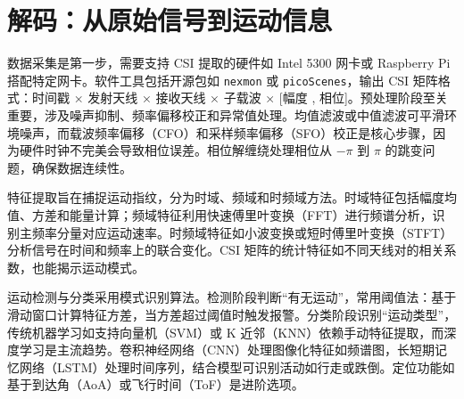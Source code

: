 \chapter{解码：从原始信号到运动信息}
数据采集是第一步，需要支持 CSI 提取的硬件如 Intel 5300 网卡或 Raspberry Pi 搭配特定网卡。软件工具包括开源包如 \texttt{nexmon} 或 \texttt{picoScenes}，输出 CSI 矩阵格式：时间戳 × 发射天线 × 接收天线 × 子载波 × [幅度 , 相位]。预处理阶段至关重要，涉及噪声抑制、频率偏移校正和异常值处理。均值滤波或中值滤波可平滑环境噪声，而载波频率偏移（CFO）和采样频率偏移（SFO）校正是核心步骤，因为硬件时钟不完美会导致相位误差。相位解缠绕处理相位从 $-\pi$ 到 $\pi$ 的跳变问题，确保数据连续性。\par
特征提取旨在捕捉运动指纹，分为时域、频域和时频域方法。时域特征包括幅度均值、方差和能量计算；频域特征利用快速傅里叶变换（FFT）进行频谱分析，识别主频率分量对应运动速率。时频域特征如小波变换或短时傅里叶变换（STFT）分析信号在时间和频率上的联合变化。CSI 矩阵的统计特征如不同天线对的相关系数，也能揭示运动模式。\par
运动检测与分类采用模式识别算法。检测阶段判断“有无运动”，常用阈值法：基于滑动窗口计算特征方差，当方差超过阈值时触发报警。分类阶段识别“运动类型”，传统机器学习如支持向量机（SVM）或 K 近邻（KNN）依赖手动特征提取，而深度学习是主流趋势。卷积神经网络（CNN）处理图像化特征如频谱图，长短期记忆网络（LSTM）处理时间序列，结合模型可识别活动如行走或跌倒。定位功能如基于到达角（AoA）或飞行时间（ToF）是进阶选项。\par

